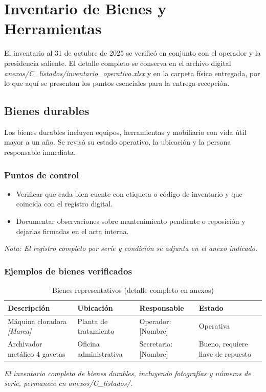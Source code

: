 \chapter{Inventario de Bienes y Herramientas}

El inventario al 31 de octubre de 2025 se verificó en conjunto con el operador y la presidencia saliente. El detalle completo se conserva en el archivo digital \emph{anexos/C\_listados/inventario\_operativo.xlsx} y en la carpeta física entregada, por lo que aquí se presentan los puntos esenciales para la entrega-recepción.

\section{Bienes durables}

Los bienes durables incluyen equipos, herramientas y mobiliario con vida útil mayor a un año. Se revisó su estado operativo, la ubicación y la persona responsable inmediata.

\subsection*{Puntos de control}
\begin{itemize}[noitemsep, topsep=0pt]
  \item Verificar que cada bien cuente con etiqueta o código de inventario y que coincida con el registro digital.
  \item Documentar observaciones sobre mantenimiento pendiente o reposición y dejarlas firmadas en el acta interna.
\end{itemize}
\textit{Nota: El registro completo por serie y condición se adjunta en el anexo indicado.}

\subsection*{Ejemplos de bienes verificados}
\begin{table}[H]
\centering
\caption{Bienes representativos (detalle completo en anexos)}
\label{tab:bienes_representativos}
\begin{tabular}{p{4.2cm} p{3cm} p{3cm} p{3cm}}
\toprule
\textbf{Descripción} & \textbf{Ubicación} & \textbf{Responsable} & \textbf{Estado} \\
\midrule
Máquina cloradora \textit{[Marca]} & Planta de tratamiento & Operador: [Nombre] & Operativa \\
Archivador metálico 4 gavetas & Oficina administrativa & Secretaria: [Nombre] & Bueno, requiere llave de repuesto \\
\bottomrule
\end{tabular}
\end{table}
\textit{El inventario completo de bienes durables, incluyendo fotografías y números de serie, permanece en \emph{anexos/C\_listados/}.}

